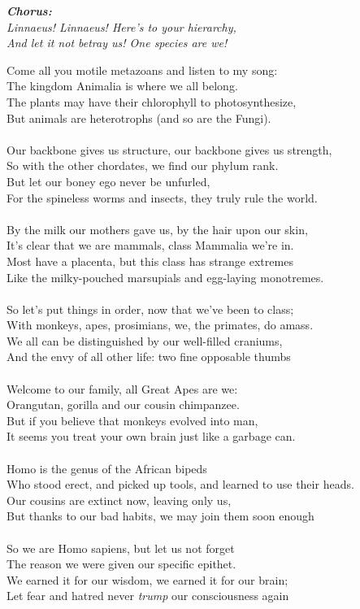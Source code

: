\documentclass[twoside,13pt,openany,letterpaper]{memoir}%
\newcommand\chorus[1]{
  \quad\Large\textit{\textbf{Chorus:}}\\\normalsize\textit{#1}
}
\begin{document}
\chorus{
  Linnaeus! Linnaeus! Here’s to your hierarchy,\\
  And let it not betray us! One species are we!\\
}

Come all you motile metazoans and listen to my song:\\
The kingdom Animalia is where we all belong.\\
The plants may have their chlorophyll to photosynthesize,\\
But animals are heterotrophs (and so are the Fungi).\\
\\
Our backbone gives us structure, our backbone gives us strength,\\
So with the other chordates, we find our phylum rank.\\
But let our boney ego never be unfurled,\\
For the spineless worms and insects, they truly rule the world.\\
\\
By the milk our mothers gave us, by the hair upon our skin,\\
It’s clear that we are mammals, class Mammalia we’re in.\\
Most have a placenta, but this class has strange extremes\\
Like the milky-pouched marsupials and egg-laying monotremes.\\
\\
So let’s put things in order, now that we’ve been to class;\\
With monkeys, apes, prosimians, we, the primates, do amass.\\
We all can be distinguished by our well-filled craniums,\\
And the envy of all other life: two fine opposable thumbs\\
\\
Welcome to our family, all Great Apes are we:\\
Orangutan, gorilla and our cousin chimpanzee.\\
But if you believe that monkeys evolved into man,\\
It seems you treat your own brain just like a garbage can.\\
\\
Homo is the genus of the African bipeds\\
Who stood erect, and picked up tools, and learned to use their heads.\\
Our cousins are extinct now, leaving only us,\\
But thanks to our bad habits, we may join them soon enough\\
\\
So we are Homo sapiens, but let us not forget\\
The reason we were given our specific epithet.\\
We earned it for our wisdom, we earned it for our brain;\\
Let fear and hatred never \textit{trump} our consciousness again\\
\end{document}
